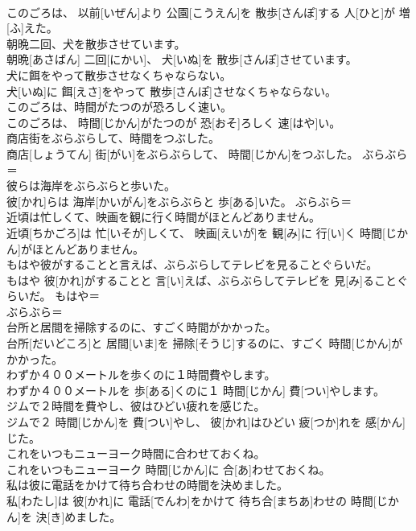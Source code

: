 \documentclass[8pt]{extreport}
\begin{document}
\begin{CJK}{UTF8}{min}
\\	このごろは、 以前[いぜん]より 公園[こうえん]を 散歩[さんぽ]する 人[ひと]が 増[ふ]えた。	
\\	朝晩二回、犬を散歩させています。	
\\	朝晩[あさばん] 二回[にかい]、 犬[いぬ]を 散歩[さんぽ]させています。	
\\	犬に餌をやって散歩させなくちゃならない。	
\\	犬[いぬ]に 餌[えさ]をやって 散歩[さんぽ]させなくちゃならない。	
\\	このごろは、時間がたつのが恐ろしく速い。	
\\	このごろは、 時間[じかん]がたつのが 恐[おそ]ろしく 速[はや]い。	
\\	商店街をぶらぶらして、時間をつぶした。	
\\	商店[しょうてん] 街[がい]をぶらぶらして、 時間[じかん]をつぶした。	ぶらぶら＝ 
\\	彼らは海岸をぶらぶらと歩いた。	
\\	彼[かれ]らは 海岸[かいがん]をぶらぶらと 歩[ある]いた。	ぶらぶら＝ 
\\	近頃は忙しくて、映画を観に行く時間がほとんどありません。	
\\	近頃[ちかごろ]は 忙[いそが]しくて、 映画[えいが]を 観[み]に 行[い]く 時間[じかん]がほとんどありません。	
\\	もはや彼がすることと言えば、ぶらぶらしてテレビを見ることぐらいだ。	
\\	もはや 彼[かれ]がすることと 言[い]えば、ぶらぶらしてテレビを 見[み]ることぐらいだ。	もはや＝ 
\\	ぶらぶら＝ 
\\	台所と居間を掃除するのに、すごく時間がかかった。	
\\	台所[だいどころ]と 居間[いま]を 掃除[そうじ]するのに、すごく 時間[じかん]がかかった。	
\\	わずか４００メートルを歩くのに１時間費やします。	
\\	わずか４００メートルを 歩[ある]くのに１ 時間[じかん] 費[つい]やします。	
\\	ジムで２時間を費やし、彼はひどい疲れを感じた。	
\\	ジムで２ 時間[じかん]を 費[つい]やし、 彼[かれ]はひどい 疲[つか]れを 感[かん]じた。	
\\	これをいつもニューヨーク時間に合わせておくね。	
\\	これをいつもニューヨーク 時間[じかん]に 合[あ]わせておくね。	
\\	私は彼に電話をかけて待ち合わせの時間を決めました。	
\\	私[わたし]は 彼[かれ]に 電話[でんわ]をかけて 待ち合[まちあ]わせの 時間[じかん]を 決[き]めました。	

\end{CJK}
\end{document}
